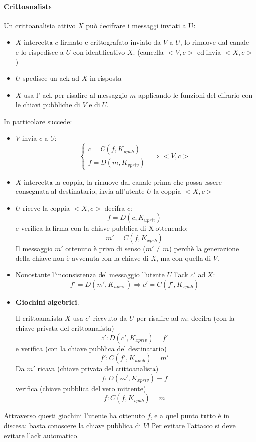 \paragraph{Crittoanalista} Un crittoanalista attivo $X$ può decifrare i messaggi inviati a U:
\begin{itemize}
    \item $X$ intercetta $c$ firmato e crittografato inviato da $V$ a $U$, lo rimuove dal canale e lo rispedisce a $U$ con identificativo $X$. (cancella $<V,c>$ ed invia $<X,c>$)
    \item $U$ spedisce un ack ad $X$ in risposta
    \item $X$ usa l' ack per risalire al messaggio $m$ applicando le funzioni del cifrario con le chiavi pubbliche di $V$ e di $U$.
\end{itemize}
In particolare succede:
\begin{itemize}
    \item $V$ invia $c$ a $U$:
        $$
            \begin{cases}
                c = C(f, K_{upub}) \\
                f = D(m, K_{vpriv})
            \end{cases}
            \implies <V,c>
        $$
    \item $X$ intercetta la coppia, la rimuove dal canale prima che possa essere consegnata al destinatario, invia all'utente $U$ la coppia $<X,c>$
    \item $U$ riceve la coppia $<X,c>$ decifra $c$:
    $$ f = D(c, K_{upriv}) $$
    e verifica la firma con la chiave pubblica di X ottenendo:
    $$ m' = C(f, K_{xpub}) $$
    Il messaggio $m'$ ottenuto è privo di senso ($m' \neq m$) perchè la generazione della chiave non è avvenuta con la chiave di $X$, ma con quella di $V$. 
    \item Nonostante l'inconsistenza del messaggio l'utente $U$ l'ack $c'$ ad $X$:
    $$ f' = D(m', K_{upriv}) \Longrightarrow c' = C(f', K_{xpub}) $$
    \item \textbf{Giochini algebrici}.
    
    Il crittoanalista $X$ usa $c'$ ricevuto da $U$ per risalire ad $m$: decifra (con la chiave privata del crittoanalista) $$c': D(c', K_{xpriv}) = f'$$ e verifica (con la chiave pubblica del destinatario) $$f': C(f', K_{upub}) = m'$$Da $m'$ ricava (chiave privata del crittoanalista) $$f: D(m', K_{xpriv})=f$$verifica (chiave pubblica del vero mittente)$$f: C(f, K_{vpub}) = m$$
\end{itemize}
Attraverso questi giochini l'utente ha ottenuto $f$, e a quel punto tutto è in discesa: basta conoscere la chiave pubblica di $V$! Per evitare l'attacco si deve evitare l'ack automatico.

